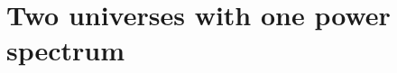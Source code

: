 \providecommand{\VdAlHD}{}\renewcommand{\VdAlHD}{2.112}
\providecommand{\VdBeHD}{}\renewcommand{\VdBeHD}{9.147}
\providecommand{\VdCumThreeD}{}\renewcommand{\VdCumThreeD}{-0.002524}
\providecommand{\VdVmaxD}{}\renewcommand{\VdVmaxD}{251.7}
\providecommand{\VdVlinmaxD}{}\renewcommand{\VdVlinmaxD}{181.7}
\providecommand{\VdVzamaxD}{}\renewcommand{\VdVzamaxD}{267}
\providecommand{\VdWallD}{}\renewcommand{\VdWallD}{0.1142}
\providecommand{\ApNvoid}{}\renewcommand{\ApNvoid}{1530}
\providecommand{\ApQtrue}{}\renewcommand{\ApQtrue}{1.05}
\providecommand{\ApFzero}{}\renewcommand{\ApFzero}{0.5273}
\providecommand{\ApQreal}{}\renewcommand{\ApQreal}{1.007}
\providecommand{\ApQrealErr}{}\renewcommand{\ApQrealErr}{0.009846}
\providecommand{\ApQap}{}\renewcommand{\ApQap}{1.055}
\providecommand{\ApQapErr}{}\renewcommand{\ApQapErr}{0.01172}
\providecommand{\ApQrsd}{}\renewcommand{\ApQrsd}{1.098}
\providecommand{\ApQrsdErr}{}\renewcommand{\ApQrsdErr}{0.01035}
\providecommand{\ApQboth}{}\renewcommand{\ApQboth}{1.155}
\providecommand{\ApQbothErr}{}\renewcommand{\ApQbothErr}{0.01141}
\providecommand{\ApQprod}{}\renewcommand{\ApQprod}{1.159}
\providecommand{\ApLevel}{}\renewcommand{\ApLevel}{-0.5}
\providecommand{\ApNjk}{}\renewcommand{\ApNjk}{27}
\providecommand{\ApRzero}{}\renewcommand{\ApRzero}{1.134}
\providecommand{\ApQrsdLin}{}\renewcommand{\ApQrsdLin}{1.141}
\providecommand{\ApQrsdZA}{}\renewcommand{\ApQrsdZA}{1.219}
\providecommand{\ApQcontZA}{}\renewcommand{\ApQcontZA}{1.086}
\providecommand{\ApQcontLin}{}\renewcommand{\ApQcontLin}{1.079}
\providecommand{\ApParZA}{}\renewcommand{\ApParZA}{1.158}
\providecommand{\ApPerpZA}{}\renewcommand{\ApPerpZA}{1.066}
\providecommand{\ApParLin}{}\renewcommand{\ApParLin}{1.131}
\providecommand{\ApPerpLin}{}\renewcommand{\ApPerpLin}{1.049}
\providecommand{\ApParMeas}{}\renewcommand{\ApParMeas}{1.116}
\providecommand{\ApPerpMeas}{}\renewcommand{\ApPerpMeas}{1.043}
\providecommand{\ApQapPct}{}\renewcommand{\ApQapPct}{1.1}
\providecommand{\ApZ}{}\renewcommand{\ApZ}{0.51}
\providecommand{\ApDMH}{}\renewcommand{\ApDMH}{0.5937}
\providecommand{\ApDlnqDom}{}\renewcommand{\ApDlnqDom}{0.3431}
\providecommand{\ApSigOm}{}\renewcommand{\ApSigOm}{0.03254}
\providecommand{\ApDMHHam}{}\renewcommand{\ApDMHHam}{0.588}
\providecommand{\ApDMHHamErr}{}\renewcommand{\ApDMHHamErr}{0.004}
 
\section{Two universes with one power spectrum}
\label{11b:sec:same}


